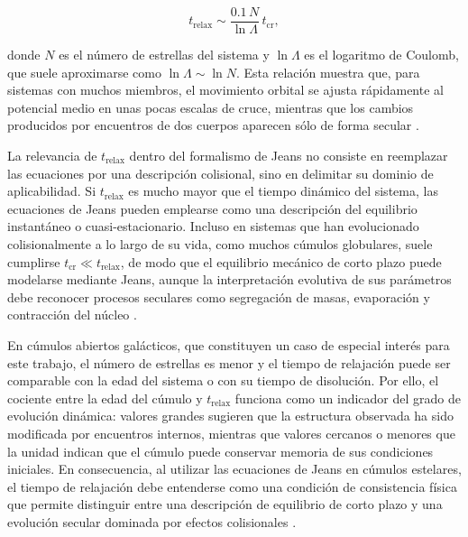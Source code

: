                 \begin{equation}
                    t_{\mathrm{relax}} \sim 
                    \frac{0.1\,N}{\ln \Lambda}\,t_{\mathrm{cr}},
                \end{equation}

                donde $N$ es el número de estrellas del sistema y 
                $\ln \Lambda$ es el logaritmo de Coulomb, que suele aproximarse 
                como $\ln \Lambda \sim \ln N$. Esta relación muestra que, para 
                sistemas con muchos miembros, el movimiento orbital se ajusta 
                rápidamente al potencial medio en unas pocas escalas de cruce, 
                mientras que los cambios producidos por encuentros de dos 
                cuerpos aparecen sólo de forma secular 
                \cite{Spitzer1987,BinneyTremaine2008}.

                La relevancia de $t_{\mathrm{relax}}$ dentro del formalismo de 
                Jeans no consiste en reemplazar las ecuaciones por una 
                descripción colisional, sino en delimitar su dominio de 
                aplicabilidad. Si $t_{\mathrm{relax}}$ es mucho mayor que el 
                tiempo dinámico del sistema, las ecuaciones de Jeans pueden 
                emplearse como una descripción del equilibrio instantáneo o 
                cuasi-estacionario. Incluso en sistemas que han evolucionado 
                colisionalmente a lo largo de su vida, como muchos cúmulos 
                globulares, suele cumplirse $t_{\mathrm{cr}}\ll 
                t_{\mathrm{relax}}$, de modo que el equilibrio mecánico de corto 
                plazo puede modelarse mediante Jeans, aunque la interpretación 
                evolutiva de sus parámetros debe reconocer procesos seculares 
                como segregación de masas, evaporación y contracción del núcleo 
                \cite{Spitzer1987,MeylanHeggie1997}.

                En cúmulos abiertos galácticos, que constituyen un caso de 
                especial interés para este trabajo, el número de estrellas es 
                menor y el tiempo de relajación puede ser comparable con la edad 
                del sistema o con su tiempo de disolución. Por ello, el cociente 
                entre la edad del cúmulo y $t_{\mathrm{relax}}$ funciona como un 
                indicador del grado de evolución dinámica: valores grandes 
                sugieren que la estructura observada ha sido modificada por 
                encuentros internos, mientras que valores cercanos o menores que 
                la unidad indican que el cúmulo puede conservar memoria de sus 
                condiciones iniciales. En consecuencia, al utilizar las 
                ecuaciones de Jeans en cúmulos estelares, el tiempo de 
                relajación debe entenderse como una condición de consistencia 
                física que permite distinguir entre una descripción de equilibrio 
                de corto plazo y una evolución secular dominada por efectos 
                colisionales \cite{Spitzer1987,BinneyTremaine2008}.

